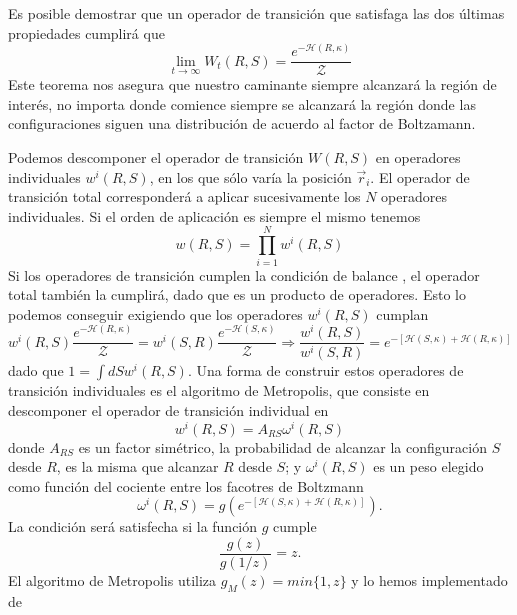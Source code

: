 Es posible demostrar que un operador de transición que satisfaga las dos
últimas propiedades cumplirá que
\begin{equation}
\lim_{t\rightarrow \infty}W_t(R,S)=\frac{e^{-\mathcal{H}(R,\kappa)}}{\mathcal{Z}}
\end{equation}
Este teorema nos asegura que nuestro caminante siempre alcanzará la región de
interés, no importa donde comience siempre se alcanzará la región donde las configuraciones siguen una
distribución de acuerdo al factor de Boltzamann. 

Podemos descomponer el operador de transición $W(R,S)$ en operadores
individuales $w^i(R,S)$, en los que sólo varía la posición $\vec{r}_i$. El
operador de transición total corresponderá a aplicar sucesivamente los $N$
operadores individuales. Si el orden de aplicación es siempre el mismo tenemos
\begin{equation*}
w(R,S)=\prod^{N}_{i=1}w^i(R,S)
\end{equation*}
Si los operadores de transición cumplen la condición de
balance \label{ecuacion_balance}, el operador total también la cumplirá, dado
que es un producto de operadores. Esto lo podemos conseguir exigiendo que los operadores
$w^i(R,S)$ cumplan
\begin{equation}\label{balance_detallado}
w^i(R,S)\frac{e^{-\mathcal{H}(R,\kappa)}}{\mathcal{Z}}=w^i(S,R)\frac{e^{-\mathcal{H}(S,\kappa)}}{\mathcal{Z}}\Rightarrow \frac{w^i(R,S)}{w^i(S,R)}=e^{-[\mathcal{H}(S,\kappa)+\mathcal{H}(R,\kappa)]}
\end{equation}
dado que $1=\int dS w^i(R,S)$. Una forma de construir estos operadores de
transición individuales es el algoritmo de Metropolis, que consiste en
descomponer el operador de transición individual en 
 \begin{equation*}
 w^i(R,S)=A_{RS}\omega^i(R,S)
\end{equation*}
donde $A_{RS}$ es un factor simétrico, la probabilidad de alcanzar la
configuración $S$ desde $R$, es la misma que alcanzar $R$ desde $S$; y
$\omega^i(R,S)$ es un peso elegido como función del cociente entre los
facotres de Boltzmann
\begin{equation*}
\omega^i(R,S)=g(e^{-[\mathcal{H}(S,\kappa)+\mathcal{H}(R,\kappa)]}).
\end{equation*}
La condición \label{balance_detallado} será satisfecha si la función $g$
cumple
\begin{equation}
\frac{g(z)}{g(1/z)}=z.
\end{equation}
El algoritmo de Metropolis utiliza $g_M(z)=min\{1,z\}$ y lo hemos implementado de
